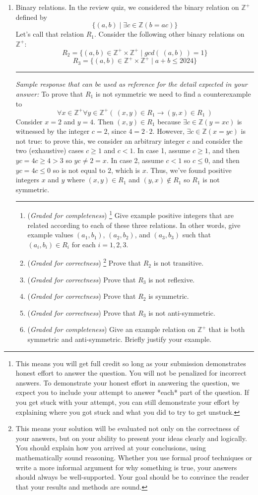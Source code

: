\documentclass[12pt, oneside]{article}
\newcommand{\gradeCorrect}{({\it Graded for correctness}) }
\newcommand{\gradeCorrectFirst}{\gradeCorrect\footnote{This means your solution 
will be evaluated not only on the correctness of your answers, but on your ability
to present your ideas clearly and logically. You should explain how you 
arrived at your conclusions, using
mathematically sound reasoning. Whether you use formal proof techniques or 
write a more informal argument
for why something is true, your answers should always be well-supported. 
Your goal should be to convince the
reader that your results and methods are sound.} }
\newcommand{\gradeComplete}{({\it Graded for completeness}) }
\newcommand{\gradeCompleteFirst}{\gradeComplete\footnote{This means you will 
get full credit so long as your submission demonstrates honest effort to 
answer the question. You will not be penalized for incorrect answers. 
To demonstrate your honest effort in answering the question, we 
expect you to include your attempt to answer *each* part of the question. 
If you get stuck with your attempt, you can still demonstrate 
your effort by explaining where you got stuck and what 
you did to try to get unstuck.} }
\begin{document}
\begin{enumerate}[labelindent=0pt, leftmargin=0pt]
    \item Binary relations. In the review quiz, we considered the binary relation on 
    $\mathbb{Z}^+$ defined by 
    \[\{(a,b) \mid \exists c \in \mathbb{Z}(b = ac)\}
    \]
    Let's call that relation $R_1$.
    Consider the following other binary relations on $\mathbb{Z}^{+}$:
    \[
    R_2 = \{ (a,b) \in \mathbb{Z}^+ \times \mathbb{Z}^+ \mid gcd (~ (a,b) ~) = 1\}    
    \]
    \[
    R_3 = \{ (a,b) \in \mathbb{Z}^+ \times \mathbb{Z}^+ \mid a+b \leq 2024 \}    
    \]


    \rule{0.5\textwidth}{.4pt}
    
    {\it Sample response that can be used as reference for the detail expected 
    in your answer:} 
    To prove that $R_1$ is not symmetric we need to find a counterexample 
    to 
    \[
        \forall x \in \mathbb{Z}^+ \forall y \in \mathbb{Z}^+ \left(~(x,y) \in R_1 \to (y,x) \in R_1 ~\right)
    \]
    Consider $x = 2$ and $y=4$. Then $(x,y) \in R_1$ because $\exists c \in \mathbb{Z} ( y = xc )$ is witnessed
    by the integer $c = 2$, since $4 = 2 \cdot 2$. However, $\exists c  \in \mathbb{Z} ( x = yc )$ is not
    true: to prove this, we consider an arbitrary integer $c$ and consider the two 
    (exhaustive) cases $c \geq 1$ and $c < 1$. 
    In case 1,
    assume $c \geq 1$, and then $yc = 4c \geq 4 > 3$ so $yc \neq 2 = x$. In case 2, assume $c < 1$ so $c \leq 0$,
    and then $yc = 4c \leq 0$ so is not equal to $2$, which is $x$. Thus, we've found positive integers 
    $x$ and $y$ where $(x,y) \in R_1$ and $(y,x) \notin R_1$ so $R_1$ is not symmetric.

    \rule{0.5\textwidth}{.4pt}
    


    \begin{enumerate}
        \item\gradeCompleteFirst Give example positive integers that are related
        according to each of these three relations. In other words, give 
        example values $(a_1, b_1)$, $(a_2, b_2)$, and $(a_3, b_3)$ such that
        $(a_i, b_i) \in R_i$ for each $i =1,2,3$.
        \item\gradeCorrectFirst Prove that $R_2$ is not transitive.
        \item\gradeCorrect Prove that $R_3$ is not reflexive.
        \item\gradeCorrect Prove that $R_2$ is symmetric. 
        \item\gradeCorrect Prove that $R_3$ is not anti-symmetric.
        \item\gradeComplete Give an example relation on $\mathbb{Z}^+$ that is both symmetric and anti-symmetric.
        Briefly justify your example.
        \end{enumerate}
    


\end{enumerate}
\end{document}

